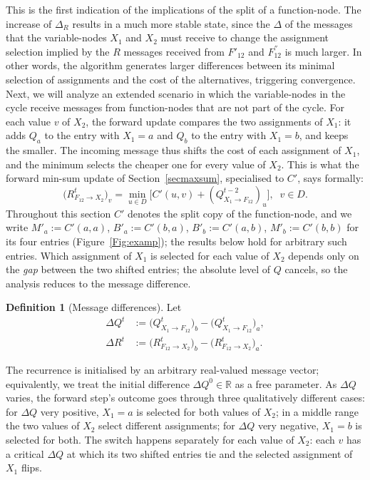 \documentclass[letterpaper]{article} %
\theoremstyle{definition}
\newtheorem{definition}[theorem]{Definition}
\theoremstyle{remark}
\begin{document}
This is the first indication of the implications of the split of a function-node. The increase of $\Delta_R$ results in a much more stable state, since the $\Delta$ of the messages that the variable-nodes $X_1$ and $X_2$ must receive to change the assignment selection implied by the $R$ messages received from $F'_{12}$ and $F^{''}_{12}$ is much larger. In other words, the algorithm generates larger differences between its minimal selection of assignments and the cost of the alternatives, triggering convergence.
Next, we will analyze an extended scenario in which the variable-nodes in the cycle receive messages from function-nodes that are not part of the cycle.
For each value $v$ of $X_2$, the forward update compares the two assignments of $X_1$: it adds $Q_a$ to the entry with $X_1=a$ and $Q_b$ to the entry with $X_1=b$, and keeps the smaller.  The incoming message thus shifts the cost of each assignment of $X_1$, and the minimum selects the cheaper one for every value of $X_2$.  This is what the forward min-sum update of Section~\ref{secmaxsum}, specialised to $C'$, says formally:
\begin{equation}\label{eq:minsumR}
    \bigl(R^t_{F_{12} \to X_2}\bigr)_v = \min_{u \in D}\bigl[C'(u, v) + (Q^{t-2}_{X_1 \to F_{12}})_u\bigr], \;\; v \in D.
\end{equation}
Throughout this section $C'$ denotes the split copy of the function-node, and we write $M'_a := C'(a,a)$, $B'_a := C'(b,a)$, $B'_b := C'(a,b)$, $M'_b := C'(b,b)$ for its four entries (Figure~\ref{Fig:examp}); the results below hold for arbitrary such entries. Which assignment of $X_1$ is selected for each value of $X_2$ depends only on the \emph{gap} between the two shifted entries; the absolute level of $Q$ cancels, so the analysis reduces to the message difference.
\begin{definition}[Message differences]\label{def:deltas}
Let
\[
    \begin{aligned}
        \Delta Q^t &:= \bigl(Q^t_{X_1 \to F_{12}}\bigr)_b - \bigl(Q^t_{X_1 \to F_{12}}\bigr)_a, \\
        \Delta R^t &:= \bigl(R^t_{F_{12} \to X_2}\bigr)_b - \bigl(R^t_{F_{12} \to X_2}\bigr)_a.
    \end{aligned}
\]
\end{definition}
\noindent The recurrence is initialised by an arbitrary real-valued message vector; equivalently, we treat the initial difference $\Delta Q^0 \in \mathbb{R}$ as a free parameter.
As $\Delta Q$ varies, the forward step's outcome goes through three qualitatively different cases: for $\Delta Q$ very positive, $X_1=a$ is selected for both values of $X_2$; in a middle range the two values of $X_2$ select different assignments; for $\Delta Q$ very negative, $X_1=b$ is selected for both.  The switch happens separately for each value of $X_2$: each $v$ has a critical $\Delta Q$ at which its two shifted entries tie and the selected assignment of $X_1$ flips.
\end{document}
